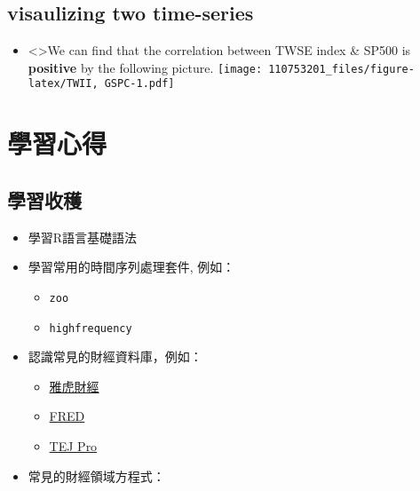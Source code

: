 \documentclass[
]{article}
\providecommand{\tightlist}{%
  \setlength{\itemsep}{0pt}\setlength{\parskip}{0pt}}
\begin{document}
\hypertarget{visaulizing-two-time-series}{%
\subsection{visaulizing two
time-series}\label{visaulizing-two-time-series}}

\begin{itemize}
\tightlist
\item
  \textless\textgreater We can find that the {correlation between TWSE
  index \& SP500 is \textbf{positive}} by the following picture.
  \texttt{[image: 110753201\_files/figure-latex/TWII, GSPC-1.pdf]}
\end{itemize}

\hypertarget{ux5b78ux7fd2ux5fc3ux5f97}{%
\section{學習心得}\label{ux5b78ux7fd2ux5fc3ux5f97}}

\hypertarget{ux5b78ux7fd2ux6536ux7a6b}{%
\subsection{學習收穫}\label{ux5b78ux7fd2ux6536ux7a6b}}

\begin{itemize}
\tightlist
\item
  學習R語言基礎語法
\item
  學習常用的時間序列處理套件, 例如：

  \begin{itemize}
  \tightlist
  \item
    \texttt{zoo}
  \item
    \texttt{highfrequency}
  \end{itemize}
\item
  認識常見的財經資料庫，例如：

  \begin{itemize}
  \tightlist
  \item
    \href{https://\%20Finance.yahoo.com/}{雅虎財經}
  \item
    \href{https://fred.stlouisfed.org/}{FRED}
  \item
    \href{https://www.tej.com.tw/trial/TEJ\%E7\%B3\%BB\%E7\%B5\%B1\%E6\%95\%99\%E5\%AD\%B8\%E5\%BD\%B1\%E7\%89\%87\%28\%E5\%AD\%B8\%E6\%A0\%A1\%E7\%89\%88\%29}{TEJ
    Pro}
  \end{itemize}
\item
  常見的財經領域方程式：
\end{itemize}
\end{document}
